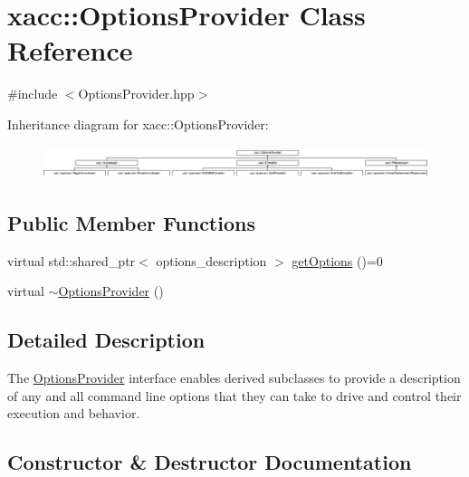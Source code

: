 \hypertarget{a01219}{}\section{xacc\+:\+:Options\+Provider Class Reference}
\label{a01219}


{\ttfamily \#include $<$Options\+Provider.\+hpp$>$}

Inheritance diagram for xacc\+:\+:Options\+Provider\+:\begin{figure}[H]
\begin{center}
\leavevmode
\includegraphics[height=0.962199cm]{a01219}
\end{center}
\end{figure}
\subsection*{Public Member Functions}
\begin{DoxyCompactItemize}
\item 
virtual std\+::shared\+\_\+ptr$<$ options\+\_\+description $>$ \hyperlink{a01219_a6d150954f852109bfe2c1ae90222926f}{get\+Options} ()=0
\item 
virtual \hyperlink{a01219_a7782757b419792ff346f563517eed8b8}{$\sim$\+Options\+Provider} ()
\end{DoxyCompactItemize}


\subsection{Detailed Description}
The \hyperlink{a01219}{Options\+Provider} interface enables derived subclasses to provide a description of any and all command line options that they can take to drive and control their execution and behavior. 

\subsection{Constructor \& Destructor Documentation}
\mbox{\label{a01219_a7782757b419792ff346f563517eed8b8}} 
